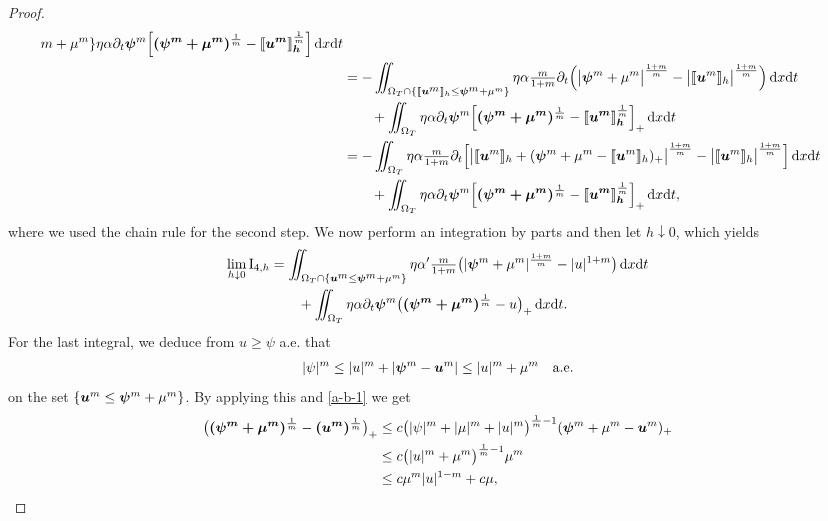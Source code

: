 \documentclass[a4paper, 10pt, american]{amsart}
\numberwithin{theorem}{section}
\numberwithin{equation}{section}
\newcommand{\dxdt}{\,\mathrm{d}x\mathrm{d}t}
\newcommand{\power}[2]{\bm{#1^{\mbox{\unboldmath{\scriptsize$#2$}}}}}
\begin{document}
\begin{proof}
\begin{align*}
{    m+\mu^m\}}
  \eta\alpha\partial_t\power\psi m\Big[\power{(\psi^m+\mu^m)}{\frac1m}
  -\power{\llbracket u^m\rrbracket_h}{\frac1m}
  \Big]\dxdt\\
  &=
  -\iint_{\Omega_T\cap\{\llbracket\power{u}{m}\rrbracket_h\le\power\psi
    m+\mu^m\}}\eta\alpha\tfrac m{1+m} \partial_t\Big(\big|\power\psi
  m+\mu^m\big|^{\frac{1+m}m}
  -\big| \llbracket \power um\rrbracket_h \big|^{\frac{1+m}m}\Big)\dxdt\\
  &\qquad +
  \iint_{\Omega_T}
  \eta\alpha\partial_t\power\psi m\Big[\power{(\psi^m+\mu^m)}{\frac1m}
  -\power{\llbracket u^m\rrbracket_h}{\frac1m}
  \Big]_+\dxdt\\
    &=
  -\iint_{\Omega_T}\eta\alpha\tfrac m{1+m} \partial_t\Big[ \big| \llbracket \power um \rrbracket_h + (\power\psi
  m+\mu^m-\llbracket \power um \rrbracket_h)_+\big|^{\frac{1+m}m}
  -\big| \llbracket \power um\rrbracket_h \big|^{\frac{1+m}m}\Big]\dxdt\\
  &\qquad +
  \iint_{\Omega_T}
  \eta\alpha\partial_t\power\psi m\Big[\power{(\psi^m+\mu^m)}{\frac1m}
  -\power{\llbracket u^m\rrbracket_h}{\frac1m}
  \Big]_+\dxdt,
\end{align*}
where we used the chain rule for the second step.
We now perform an integration by parts and then let $h\downarrow0$,
which yields
\begin{align}\label{convergence-I-4}
\nonumber
  \lim_{h\downarrow0}\mathrm{I}_{4,h}
 &=
  \iint_{\Omega_T\cap\{\power um \le \power \psi m + \mu^m\}}\eta\alpha' \tfrac m{1+m} \big(|\power\psi m+\mu^m|^{\frac{1+m}m}-|u|^{1+m}
  \big)\dxdt\\
  &\qquad+\iint_{\Omega_T}
  \eta\alpha \partial_t\power\psi m \big(\power{(\psi^m+\mu^m)}{\frac1m}
  -u \big)_+\dxdt.
\end{align}
For the last integral, we deduce from $u\ge\psi$ a.e. that
\begin{align}\label{on_the_set_psi}
|\psi|^m \le |u|^m + |\power \psi m-\power um| \le |u|^m+\mu^m
\quad\mbox{a.e.}
\end{align}
on the set $\{\power um\le\power\psi m+\mu^m\}$.
By applying this and \eqref{a-b-1} we get
\begin{align*}
\nonumber
	\big( \power{(\psi^m +\mu^m)}{\frac1m} - \power{(u^m)}{\frac1m} \big)_+
	& \le
	c\big( | \psi |^m +|\mu|^m + | u|^m \big)^{\frac1m-1}(\power \psi m + \mu^m -\power um)_+ \\\nonumber
	& \le
	c\big( |u|^{ m}+\mu^m\big)^{\frac1m-1}\mu^m\\
	&\le
	c\mu^m |u|^{1-m} + c\mu,
\end{align*}

\end{proof}
\end{document}
